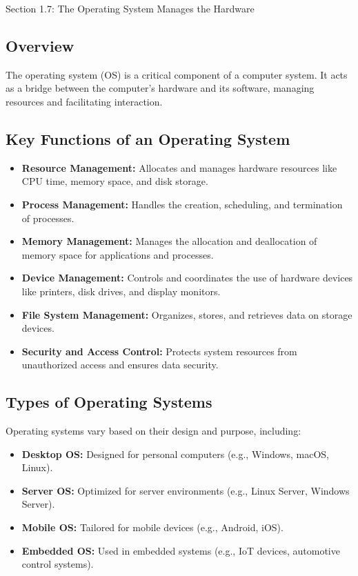 \begin{notes}{Section 1.7: The Operating System Manages the Hardware}
    \subsection*{Overview}
    The operating system (OS) is a critical component of a computer system. It acts as a bridge between the computer's hardware and its software, managing resources and facilitating interaction. \vspace*{1em}
    
    \subsection*{Key Functions of an Operating System}
    \begin{itemize}
        \item \textbf{Resource Management:} Allocates and manages hardware resources like CPU time, memory space, and disk storage.
        \item \textbf{Process Management:} Handles the creation, scheduling, and termination of processes.
        \item \textbf{Memory Management:} Manages the allocation and deallocation of memory space for applications and processes.
        \item \textbf{Device Management:} Controls and coordinates the use of hardware devices like printers, disk drives, and display monitors.
        \item \textbf{File System Management:} Organizes, stores, and retrieves data on storage devices.
        \item \textbf{Security and Access Control:} Protects system resources from unauthorized access and ensures data security.
    \end{itemize}
    
    \subsection*{Types of Operating Systems}

    Operating systems vary based on their design and purpose, including:

    \begin{itemize}
        \item \textbf{Desktop OS:} Designed for personal computers (e.g., Windows, macOS, Linux).
        \item \textbf{Server OS:} Optimized for server environments (e.g., Linux Server, Windows Server).
        \item \textbf{Mobile OS:} Tailored for mobile devices (e.g., Android, iOS).
        \item \textbf{Embedded OS:} Used in embedded systems (e.g., IoT devices, automotive control systems).
    \end{itemize}
    

\end{notes}

